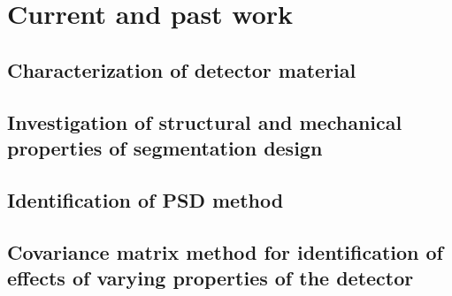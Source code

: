\documentclass[11pt]{article}
\begin{document}
\section{Current and past work}

\subsection{Characterization of detector material}

\subsection{Investigation of structural and mechanical properties of segmentation design}

\subsection{Identification of PSD method}

\subsection{Covariance matrix method for identification of effects of varying properties of the detector}





\end{document}
